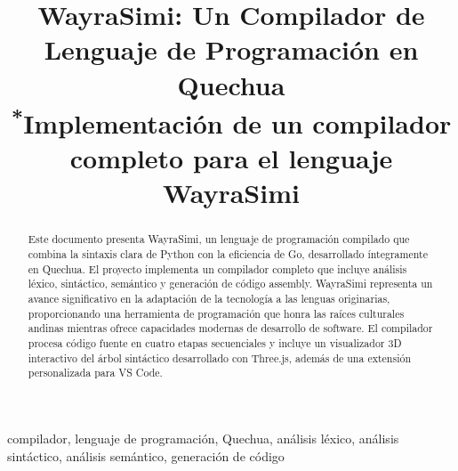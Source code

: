 \documentclass[conference]{IEEEtran}
\begin{document}
\title{WayraSimi: Un Compilador de Lenguaje de Programación en Quechua\\
{\footnotesize \textsuperscript{*}Implementación de un compilador completo para el lenguaje WayraSimi}}

\author{
\and
{}
\and
{}
}

\maketitle

\begin{abstract}
Este documento presenta WayraSimi, un lenguaje de programación compilado que combina la sintaxis clara de Python con la eficiencia de Go, desarrollado íntegramente en Quechua. El proyecto implementa un compilador completo que incluye análisis léxico, sintáctico, semántico y generación de código assembly. WayraSimi representa un avance significativo en la adaptación de la tecnología a las lenguas originarias, proporcionando una herramienta de programación que honra las raíces culturales andinas mientras ofrece capacidades modernas de desarrollo de software. El compilador procesa código fuente en cuatro etapas secuenciales y incluye un visualizador 3D interactivo del árbol sintáctico desarrollado con Three.js, además de una extensión personalizada para VS Code.
\end{abstract}

\begin{IEEEkeywords}
compilador, lenguaje de programación, Quechua, análisis léxico, análisis sintáctico, análisis semántico, generación de código
\end{IEEEkeywords}
\end{document}
